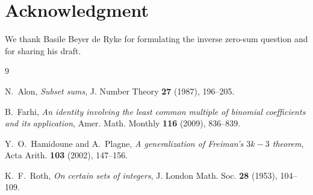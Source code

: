 \documentclass[10pt,reqno]{amsart}
\theoremstyle{remark}
\begin{document}
\section*{Acknowledgment}
We thank Basile Beyer de Ryke for formulating the inverse zero-sum question and for sharing his draft.

\begin{thebibliography}{9}

N.~Alon,
\emph{Subset sums},
J. Number Theory \textbf{27} (1987), 196--205.

B.~Farhi,
\emph{An identity involving the least common multiple of binomial coefficients and its application},
Amer. Math. Monthly \textbf{116} (2009), 836--839.

Y.~O.~Hamidoune and A.~Plagne,
\emph{A generalization of Freiman's $3k-3$ theorem},
Acta Arith. \textbf{103} (2002), 147--156.

K.~F.~Roth,
\emph{On certain sets of integers},
J. London Math. Soc. \textbf{28} (1953), 104--109.

\end{thebibliography}
\end{document}
